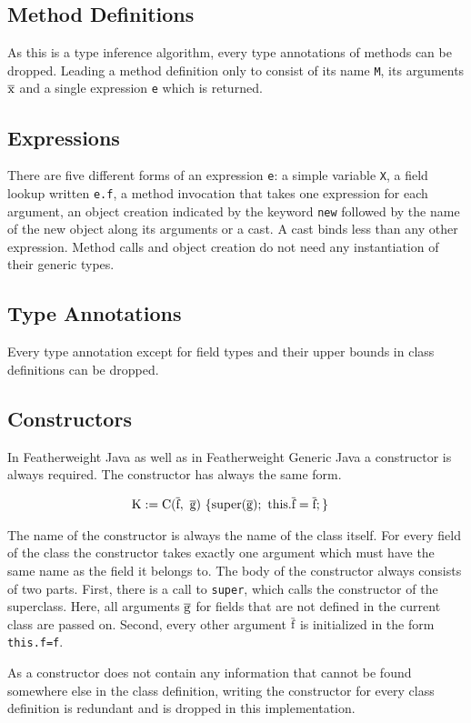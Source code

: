 \subsection{Method Definitions}

As this is a type inference algorithm, every type annotations of methods can be dropped. Leading a method definition only to consist of its name \verb|M|, its arguments $\overline{\text{x}}$ and a single expression \verb|e| which is returned.

\subsection{Expressions}

There are five different forms of an expression \verb|e|: a simple variable \verb|X|, a field lookup written \verb|e.f|, a method invocation that takes one expression for each argument, an object creation indicated by the keyword \verb|new| followed by the name of the new object along its arguments or a cast.
A cast binds less than any other expression. Method calls and object creation do not need any instantiation of their generic types.

\subsection{Type Annotations}

Every type annotation except for field types and their upper bounds in class definitions can be dropped.

\subsection{Constructors}
In Featherweight Java as well as in Featherweight Generic Java a constructor is always required. The constructor has always the same form.

\begin{align*}
    \text{K} &:= \text{C}(\overline{\text{f}}, \ \overline{\text{g}}) \ \{ \text{super}(\overline{\text{g}}); \ \text{this}.\overline{\text{f}}=\overline{\text{f}}; \}
\end{align*}

The name of the constructor is always the name of the class itself. For every field of the class the constructor takes exactly one argument which must have the same name as the field it belongs to.
The body of the constructor always consists of two parts. First, there is a call to \verb|super|, which calls the constructor of the superclass. Here, all arguments $\overline{\text{g}}$ for fields that are not defined in the current class are passed on.
Second, every other argument $\overline{\text{f}}$ is initialized in the form \verb|this.f=f|.

As a constructor does not contain any information that cannot be found somewhere else in the class definition, writing the constructor for every class definition is redundant and is dropped in this implementation.
